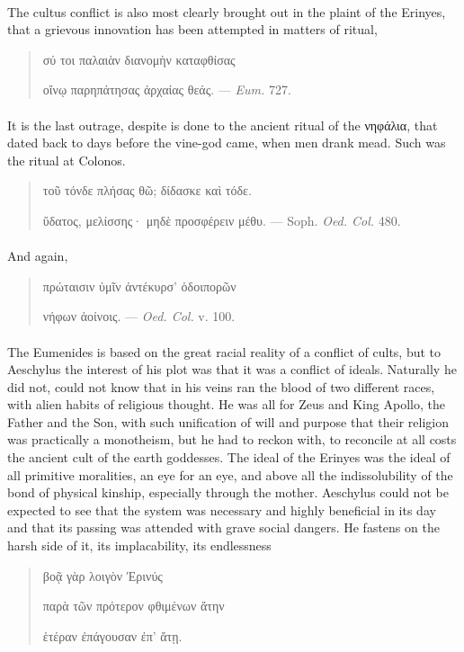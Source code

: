 \documentclass[a4paper, 11pt, oneside, polutonikogreek, english]{article}
\begin{document}
\paragraph{}
The cultus conflict is also most clearly brought out in the plaint of the Erinyes, that a grievous innovation has been attempted in matters of ritual,
\begin{quotation}
\large
σύ τοι παλαιὰν διανομὴν καταφθίσας

οἴνῳ παρηπάτησας ἀρχαίας θεάς. --- \emph{Eum.} 727.
\end{quotation}
\paragraph{}
It is the last outrage, despite is done to the ancient ritual of the νηφάλια, that dated back to days before the vine-god came, when men drank mead. Such was the ritual at Colonos.
\begin{quotation}
\large
τοῦ τόνδε πλήσας θῶ; δίδασκε καὶ τόδε.

ὕδατος, μελίσσης· μηδὲ προσφέρειν μέθυ. --- Soph. \emph{Oed. Col.} 480.
\end{quotation}
\paragraph{}
And again,
\begin{quotation}
\large
πρώταισιν ὑμῖν ἀντέκυρσ' ὁδοιπορῶν

νήφων ἀοίνοις. --- \emph{Oed. Col.} v. 100.
\end{quotation}
\paragraph{}
The Eumenides is based on the great racial reality of a conflict of cults, but to Aeschylus the interest of his plot was that it was a conflict of ideals. Naturally he did not, could not know that in his veins ran the blood of two different races, with alien habits of religious thought. He was all for Zeus and King Apollo, the Father and the Son, with such unification of will and purpose that their religion was practically a monotheism, but he had to reckon with, to reconcile at all costs the ancient cult of the earth goddesses. The ideal of the Erinyes was the ideal of all primitive moralities, an eye for an eye, and above all the indissolubility of the bond of physical kinship, especially through the mother. Aeschylus could not be expected to see that the system was necessary and highly beneficial in its day and that its passing was attended with grave social dangers. He fastens on the harsh side of it, its implacability, its endlessness
\begin{quotation}
\large
\hspace*{15mm}βοᾷ γὰρ λοιγὸν Ἐρινύς

παρὰ τῶν πρότερον φθιμένων ἄτην

ἑτέραν ἐπάγουσαν ἐπ' ἄτῃ.
\end{quotation}
\end{document}
